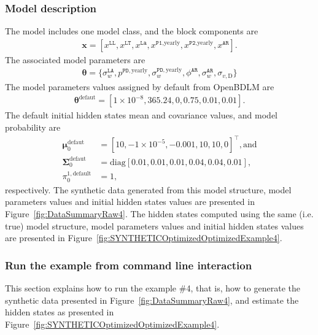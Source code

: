 \subsubsection{Model description}
The model includes one model class, and the block components are 
\begin{gather*}
\textbf{x}=[x^{\mathtt{LL}}, x^{\mathtt{LT}}, x^{\mathtt{La}}, x^{\mathtt{P1}\text{,yearly}}, x^{\mathtt{P2}\text{,yearly}}, x^{\mathtt{AR}}].
\end{gather*}
The associated model parameters are
\begin{gather*}
\bm\theta=\{\sigma_{w}^{\mathtt{LA}}, p^{\mathtt{PD}, \text{yearly}}, \sigma_{w}^{\mathtt{PD}, \text{yearly}}, \phi^{\mathtt{AR}}, \sigma_{w}^{\mathtt{AR}}, \sigma_{v,\text{D}}\} 
 \end{gather*}
The model parameters values assigned by default from OpenBDLM are
\begin{gather*}
\bm\theta^{\text{defaut}}=[ 1\times10^{-8}, 365.24, 0, 0.75, 0.01, 0.01].
\end{gather*}
The default initial hidden states mean and covariance values, and model probability are 
\begin{align*}
\bm \mu^{\text{defaut}}_{0} & = [	 10  , -1\times10^{-5}  ,	-0.001	,	10  ,  	10    ,	0  ]^{\intercal}, \text{and} \\
\bm\Sigma^{\text{defaut}}_{0} & = \text{diag}[ 0.01  ,	0.01  ,	0.01  	,0.04  ,	0.04  ,	0.01 ], \\
 \pi_{0}^{1,\text{default}} & = 1,
 \end{align*}
 respectively.
The synthetic data generated from this model structure, model parameters values and initial hidden states values are presented in Figure~\ref{fig:DataSummaryRaw4}.
The hidden states computed using the same (i.e. true) model structure, model parameters values and initial hidden states values are presented in Figure~\ref{fig:SYNTHETICOptimizedOptimizedExample4}.

\subsubsection{Run the example from command line interaction}

This section explains how to run the example \#4, that is, how to generate the synthetic data presented in Figure~\ref{fig:DataSummaryRaw4}, and estimate the hidden states as presented in Figure~\ref{fig:SYNTHETICOptimizedOptimizedExample4}.



